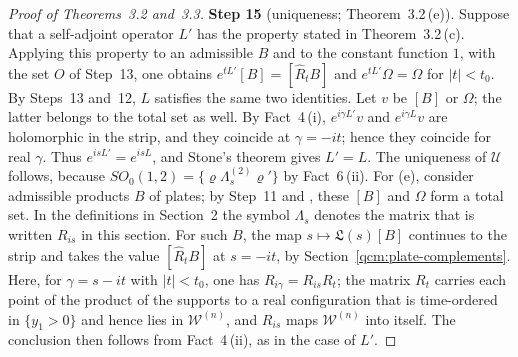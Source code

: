\documentclass[11pt,letterpaper,reqno]{amsart}
\theoremstyle{definition}
\begin{document}
\begin{proof}[Proof of Theorems~3.2 and~3.3]
\textbf{Step 15} (uniqueness; Theorem~3.2\,(e)).
Suppose that a self-adjoint operator $L'$ has the property stated in Theorem~3.2\,(c).
Applying this property to an admissible $B$ and to the constant function $1$, with the set $O$ of Step~13, one obtains $e^{tL'}[B]=[\hat R_tB]$ and $e^{tL'}\Omega=\Omega$ for $|t|<t_0$.
By Steps~13 and~12, $L$ satisfies the same two identities.
Let $v$ be $[B]$ or $\Omega$; the latter belongs to the total set as well.
By Fact~4\,(i), $e^{i\gamma L'}v$ and $e^{i\gamma L}v$ are holomorphic in the strip, and they coincide at $\gamma=-it$; hence they coincide for real $\gamma$.
Thus $e^{isL'}=e^{isL}$, and Stone's theorem gives $L'=L$.
The uniqueness of $\mathcal U$ follows, because $SO_0(1,2)=\{\varrho\Lambda^{(2)}_s\varrho'\}$ by Fact~6\,(ii).
For (e), consider admissible products $B$ of plates; by Step~11 and \cite[Section~8.2]{QEDConstruction}, these $[B]$ and $\Omega$ form a total set.
In the definitions in Section~2 the symbol $\Lambda_s$ denotes the matrix that is written $R_{is}$ in this section.
For such $B$, the map $s\mapsto\mathfrak L(s)[B]$ continues to the strip and takes the value $[\hat R_tB]$ at $s=-it$, by Section~\ref{qcm:plate-complements}.
Here, for $\gamma=s-it$ with $|t|<t_0$, one has $R_{i\gamma}=R_{is}R_t$; the matrix $R_t$ carries each point of the product of the supports to a real configuration that is time-ordered in $\{y_1>0\}$ and hence lies in $\mathcal W^{(n)}$, and $R_{is}$ maps $\mathcal W^{(n)}$ into itself.
The conclusion then follows from Fact~4\,(ii), as in the case of $L'$.


\end{proof}
\end{document}
